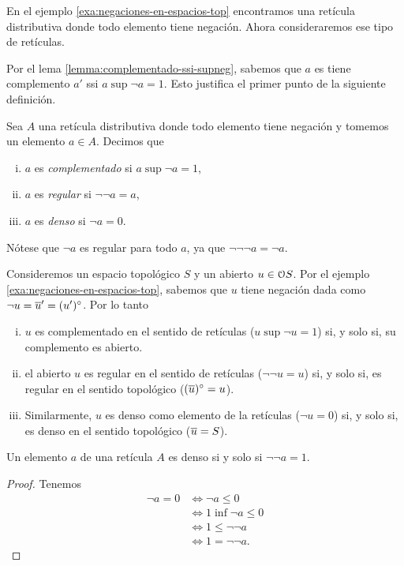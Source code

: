 En el ejemplo \ref{exa:negaciones-en-espacios-top} encontramos
una retícula distributiva donde todo elemento tiene negación.
Ahora consideraremos ese tipo de retículas.

Por el lema \ref{lemma:complementado-ssi-supneg}, sabemos que
$a$ es tiene complemento $a'$ ssi $a\sup\neg a=1$.
Esto justifica el primer punto de la siguiente definición.
\begin{definition}
  Sea $A$ una retícula distributiva donde todo elemento tiene
  negación y tomemos un elemento $a\in A$.
  Decimos que
  \begin{enumerate}[(i)]
    \item $a$ es \emph{complementado} si $a\sup\neg a=1$,
    \item $a$ es \emph{regular} si $\neg\neg a = a$,
    \item $a$ es \emph{denso} si $\neg a = 0$.
  \end{enumerate}
\end{definition}

Nótese que $\neg a$ es regular para todo $a$, ya que
$\neg\neg\neg a =\neg a$.

\begin{example}
  Consideremos un espacio topológico $S$ y un abierto $u\in\cal
  OS$. Por el ejemplo \ref{exa:negaciones-en-espacios-top},
  sabemos que $u$ tiene negación dada como $\neg u=\ol
  u'=(u')^\circ$.
  Por lo tanto
  \begin{enumerate}[(i)]
    \item
    $u$ es complementado en el sentido de retículas
    ($u\sup\neg u=1$)
    si, y solo si, su complemento es abierto.
    \item
    el abierto $u$ es regular en el sentido de retículas
    ($\neg\neg u = u$)
    si, y solo si, es regular en el sentido topológico
    ($(\ol u)^\circ=u$).
    \item
    Similarmente, $u$ es denso como elemento de la retículas
    ($\neg u=0$)
    si, y solo si, es denso en el sentido topológico
    ($\ol u=S$).
  \end{enumerate}
\end{example}

\begin{proposition}
  Un elemento $a$ de una retícula $A$ es denso
   si y solo si $\neg\neg a = 1$.
\end{proposition}
\begin{proof}
Tenemos
\begin{align*}
  \neg a = 0
  &\iff \neg a \leq 0 \\
  &\iff 1\inf \neg a \leq 0 \\
  &\iff 1\leq \neg\neg a \\
  &\iff 1=\neg\neg a.
\end{align*}
\end{proof}



